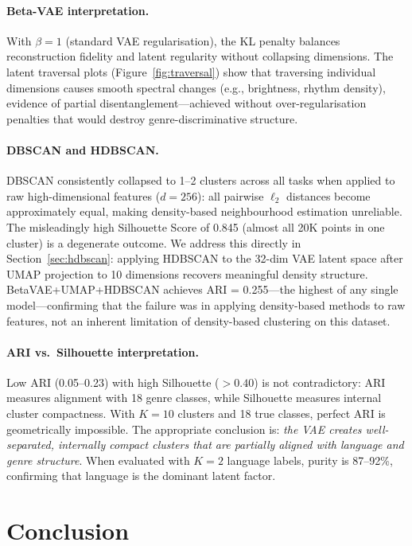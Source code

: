 \documentclass{article}
\begin{document}
\paragraph{Beta-VAE interpretation.}
With $\beta\!=\!1$ (standard VAE regularisation), the KL penalty balances reconstruction fidelity and latent regularity without collapsing dimensions. The latent traversal plots (Figure~\ref{fig:traversal}) show that traversing individual dimensions causes smooth spectral changes (e.g., brightness, rhythm density), evidence of partial disentanglement---achieved without over-regularisation penalties that would destroy genre-discriminative structure.

\paragraph{DBSCAN and HDBSCAN.}
DBSCAN consistently collapsed to 1--2 clusters across all tasks when applied to raw high-dimensional features ($d\!=\!256$): all pairwise $\ell_2$ distances become approximately equal, making density-based neighbourhood estimation unreliable. The misleadingly high Silhouette Score of 0.845 (almost all 20K points in one cluster) is a degenerate outcome. We address this directly in Section~\ref{sec:hdbscan}: applying HDBSCAN to the 32-dim VAE latent space after UMAP projection to 10 dimensions recovers meaningful density structure. BetaVAE+UMAP+HDBSCAN achieves ARI = 0.255---the highest of any single model---confirming that the failure was in applying density-based methods to raw features, not an inherent limitation of density-based clustering on this dataset.

\paragraph{ARI vs.\ Silhouette interpretation.}
Low ARI (0.05--0.23) with high Silhouette ($>0.40$) is not contradictory: ARI measures alignment with 18 genre classes, while Silhouette measures internal cluster compactness. With $K\!=\!10$ clusters and 18 true classes, perfect ARI is geometrically impossible. The appropriate conclusion is: \emph{the VAE creates well-separated, internally compact clusters that are partially aligned with language and genre structure}. When evaluated with $K\!=\!2$ language labels, purity is 87--92\%, confirming that language is the dominant latent factor.

\section{Conclusion}
\end{document}
